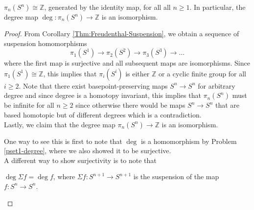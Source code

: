 \begin{corollary}
    $\pi_n\left( S^{n} \right) \cong \mathbb{Z}$, generated
    by the identity map, for all all
    $n\ge 1$. In particular, the degree map
    $\deg \colon \pi_n \left( S^{n} \right) \to \mathbb{Z}$ is an
    isomorphism.
\end{corollary}

\begin{proof}
    From Corollary \ref{Thm:Freudenthal-Suspension}, we
    obtain a sequence of suspension homomorphisms
    \[
    \pi_1 \left( S^{1} \right) \to \pi_2\left( S^2 \right) 
    \to \pi_3 \left( S^3 \right) \to \ldots
    \] 
    where the first map is surjective and all
    subsequent maps are isomorphisms.
    Since $\pi_1 \left( S^{1} \right) \cong \mathbb{Z}$,
    this implies that $\pi_i \left( S^{i} \right) $ 
    is either $\mathbb{Z}$ or a cyclic finite group for
    all  $i\ge 2$.
    Note that there exist basepoint-preserving maps
    $S^{n} \to S^{n}$ for arbitrary degree and since
    degree is a homotopy invariant, this implies that
    $\pi_n \left( S^{n} \right) $ must be infinite for
    all $n\ge 2$ since otherwise there would be
    maps $S^{n} \to S^{n}$ that are based homotopic but
    of different degrees which is a contradiction.\\
    Lastly, we claim that the degree map
    $\pi_n \left( S^{n} \right) \to \mathbb{Z}$ is an
    isomorphism.

    One way to see this is first to note
    that $\deg$ is a homomorphism by
    Problem \ref{pset1-degree}, where we also
    showed it to be surjective.\\
    A different way to show surjectivity is to
    note that

    \begin{proposition}[]
        $\deg \Sigma f = \deg f$, where
        $\Sigma f \colon S^{n+1} \to S^{n+1}$ is the suspension
        of the map $f\colon S^{n} \to S^{n}$.
    \end{proposition}


\end{proof}
